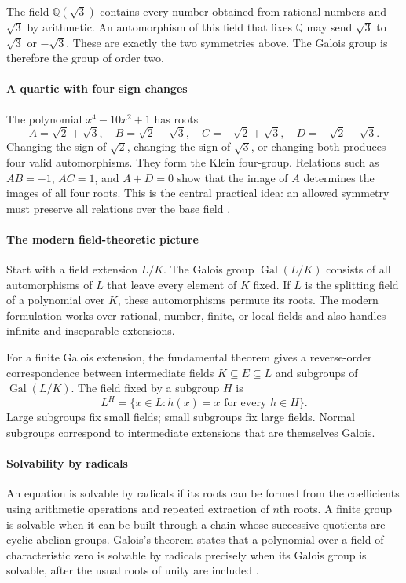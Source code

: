 The field $\mathbb{Q}(\sqrt3)$ contains every number obtained from rational numbers and $\sqrt3$ by arithmetic. An automorphism of this field that fixes $\mathbb{Q}$ may send $\sqrt3$ to $\sqrt3$ or $-\sqrt3$. These are exactly the two symmetries above. The Galois group is therefore the group of order two.

\paragraph{A quartic with four sign changes}
The polynomial $x^4-10x^2+1$ has roots
\[
A=\sqrt2+\sqrt3,\quad B=\sqrt2-\sqrt3,\quad
C=-\sqrt2+\sqrt3,\quad D=-\sqrt2-\sqrt3.
\]
Changing the sign of $\sqrt2$, changing the sign of $\sqrt3$, or changing both produces four valid automorphisms. They form the Klein four-group. Relations such as $AB=-1$, $AC=1$, and $A+D=0$ show that the image of $A$ determines the images of all four roots. This is the central practical idea: an allowed symmetry must preserve all relations over the base field \cite{galois_theory_ref2}.

\paragraph{The modern field-theoretic picture}
Start with a field extension $L/K$. The Galois group $\operatorname{Gal}(L/K)$ consists of all automorphisms of $L$ that leave every element of $K$ fixed. If $L$ is the splitting field of a polynomial over $K$, these automorphisms permute its roots. The modern formulation works over rational, number, finite, or local fields and also handles infinite and inseparable extensions.

For a finite Galois extension, the fundamental theorem gives a reverse-order correspondence between intermediate fields $K\subseteq E\subseteq L$ and subgroups of $\operatorname{Gal}(L/K)$. The field fixed by a subgroup $H$ is
\[
L^H=\{x\in L:h(x)=x\text{ for every }h\in H\}.
\]
Large subgroups fix small fields; small subgroups fix large fields. Normal subgroups correspond to intermediate extensions that are themselves Galois.

\paragraph{Solvability by radicals}
An equation is solvable by radicals if its roots can be formed from the coefficients using arithmetic operations and repeated extraction of $n$th roots. A finite group is solvable when it can be built through a chain whose successive quotients are cyclic abelian groups. Galois's theorem states that a polynomial over a field of characteristic zero is solvable by radicals precisely when its Galois group is solvable, after the usual roots of unity are included \cite{galois_theory_ref1}.

